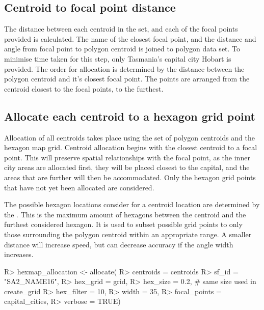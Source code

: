 \documentclass[
]{jss}
\begin{document}
\hypertarget{centroid-to-focal-point-distance}{%
\subsection{Centroid to focal point
distance}\label{centroid-to-focal-point-distance}}

The distance between each centroid in the set, and each of the focal
points provided is calculated. The name of the closest focal point, and
the distance and angle from focal point to polygon centroid is joined to
polygon data set. To minimise time taken for this step, only Tasmania's
capital city Hobart is provided. The order for allocation is determined
by the distance between the polygon centroid and it's closest focal
point. The points are arranged from the centroid closest to the focal
points, to the furthest.

\hypertarget{allocate-each-centroid-to-a-hexagon-grid-point}{%
\subsection{Allocate each centroid to a hexagon grid
point}\label{allocate-each-centroid-to-a-hexagon-grid-point}}

Allocation of all centroids takes place using the set of polygon
centroids and the hexagon map grid. Centroid allocation begins with the
closest centroid to a focal point. This will preserve spatial
relationships with the focal point, as the inner city areas are
allocated first, they will be placed closest to the capital, and the
areas that are further will then be accommodated. Only the hexagon grid
points that have not yet been allocated are considered.

The possible hexagon locations consider for a centroid location are
determined by the . This is the maximum amount of
hexagons between the centroid and the furthest considered hexagon. It is
used to subset possible grid points to only those surrounding the
polygon centroid within an appropriate range. A smaller distance will
increase speed, but can decrease accuracy if the angle width increases.

\begin{CodeChunk}

\begin{CodeInput}
R> hexmap_allocation <- allocate(
R>   centroids = centroids %
R>   sf_id = "SA2_NAME16",
R>   hex_grid = grid,
R>   hex_size = 0.2, # same size used in create_grid
R>   hex_filter = 10,
R>   width = 35,
R>   focal_points = capital_cities,
R>   verbose = TRUE)
\end{CodeInput}
\end{CodeChunk}
\end{document}
